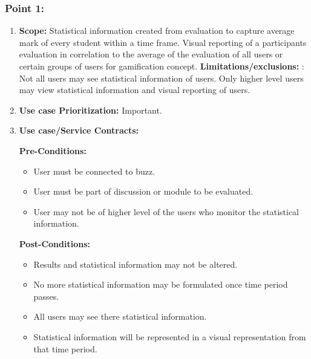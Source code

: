 \documentclass[11pt]{article}
\begin{document}
\subsubsection{Point 1:}
\begin{enumerate}
\item 
\textbf{Scope:}
Statistical information created from evaluation to capture average mark of every student within a time frame. Visual reporting of a participants evaluation in correlation to the average of the evaluation of all users or certain groups of users for gamification concept.
\newline
\textbf{Limitations/exclusions:} : Not all users may see statistical information of users. Only higher level users may view statistical information and visual reporting of users.

\item 
\textbf{Use case Prioritization:} Important.

\item 
\textbf{Use case/Service Contracts:} 

\textbf{Pre-Conditions: }
\begin{itemize}
\item User must be connected to buzz.

\item User must be part of discussion or module to be evaluated.

\item User may not be of higher level of the users who monitor the statistical information.


\end{itemize}
 

\textbf{Post-Conditions: }
\begin{itemize}

\item Results and statistical information may not be altered.
\item No more statistical information may be formulated once time period passes.
\item All users may see there statistical information.
\item Statistical information will be represented in a visual representation from that time period.



\end{itemize}
\end{enumerate}
\end{document}
